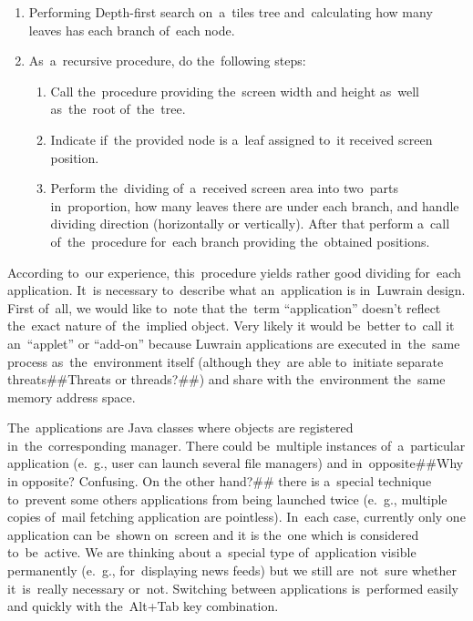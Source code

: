 \documentclass{acm_proc_article-sp}
\begin{document}
\begin{enumerate}

\item {
Performing Depth-first search on~a~tiles tree and~calculating 
how many leaves has each branch of~each node.
}

\item {
As~a~recursive procedure, do the~following steps:
}

\begin{enumerate}

\item{
Call the~procedure providing the~screen width and height as~well as~the~root of~the~tree. 
}

\item {
Indicate if~the provided node is a~leaf assigned to~it received screen position.
}

\item {
Perform the~dividing of~a~received screen area into two~parts 
in~proportion, how many leaves there are under each branch, and handle dividing direction (horizontally or vertically).
After that perform a~call of~the~procedure for~each branch providing the~obtained positions.
}
\end{enumerate}
\end{enumerate}

According to~our experience, this~procedure yields rather good dividing for~each application.
It~is necessary to~describe what an~application is in~Luwrain design.
First of~all, we would like to~note that the~term ``application'' doesn't reflect the~exact nature of~the~implied object.
Very likely it would be~better to~call it an~``applet'' or ``add-on'' because Luwrain applications 
are executed in~the~same process as~the~environment itself (although they~are able to~initiate separate threats##Threats or threads?##) and share with the~environment the~same memory address space.

The~applications are Java classes where objects are registered in~the~corresponding manager.
There could be~multiple instances of~a~particular application (e.~g., user can launch several file managers)
and in~opposite##Why in opposite? Confusing. On the other hand?## there is a~special technique to~prevent some others applications from being launched twice (e.~g., multiple copies of~mail fetching application are pointless).
In~each case, currently only one application can be~shown on~screen 
and it is the~one which is considered to~be~active.
We are thinking about a~special type of~application visible permanently 
(e.~g., for~displaying news feeds)
but we still are~not~sure whether it~is~really necessary or~not.
Switching between applications is~performed easily  and quickly with the~Alt+Tab key combination.
\end{document}
